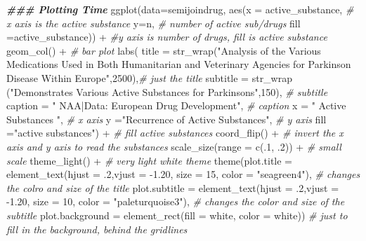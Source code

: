 \documentclass[
]{article}
\newenvironment{Shaded}{\begin{snugshade}}{\end{snugshade}}
\newcommand{\AttributeTok}[1]{\textcolor[rgb]{0.77,0.63,0.00}{#1}}
\newcommand{\CommentTok}[1]{\textcolor[rgb]{0.56,0.35,0.01}{\textit{#1}}}
\newcommand{\DecValTok}[1]{\textcolor[rgb]{0.00,0.00,0.81}{#1}}
\newcommand{\DocumentationTok}[1]{\textcolor[rgb]{0.56,0.35,0.01}{\textbf{\textit{#1}}}}
\newcommand{\FloatTok}[1]{\textcolor[rgb]{0.00,0.00,0.81}{#1}}
\newcommand{\FunctionTok}[1]{\textcolor[rgb]{0.00,0.00,0.00}{#1}}
\newcommand{\NormalTok}[1]{#1}
\newcommand{\SpecialCharTok}[1]{\textcolor[rgb]{0.00,0.00,0.00}{#1}}
\newcommand{\StringTok}[1]{\textcolor[rgb]{0.31,0.60,0.02}{#1}}
\begin{document}
\begin{Shaded}
\begin{Highlighting}[]
\DocumentationTok{\#\#\# Plotting Time}
  \FunctionTok{ggplot}\NormalTok{(}\AttributeTok{data=}\NormalTok{semijoindrug,}
    \FunctionTok{aes}\NormalTok{(}\AttributeTok{x =}\NormalTok{ active\_substance,     }\CommentTok{\# x axis is the active substance}
        \AttributeTok{y=}\NormalTok{n,  }\CommentTok{\# number of active sub/drugs}
        \AttributeTok{fill =}\NormalTok{active\_substance)) }\SpecialCharTok{+}  \CommentTok{\#y axis is number of drugs, fill is active substance}
  \FunctionTok{geom\_col}\NormalTok{() }\SpecialCharTok{+}  \CommentTok{\# bar plot}
  \FunctionTok{labs}\NormalTok{(}
    \AttributeTok{title =} \FunctionTok{str\_wrap}\NormalTok{(}\StringTok{"Analysis of the Various Medications Used in Both Humanitarian and Veterinary Agencies for Parkinson Disease Within Europe"}\NormalTok{,}\DecValTok{2500}\NormalTok{),}\CommentTok{\# just the title}
    \AttributeTok{subtitle =} \FunctionTok{str\_wrap}\NormalTok{ (}\StringTok{"Demonstrates Various Active Substances for Parkinsons"}\NormalTok{,}\DecValTok{150}\NormalTok{),   }\CommentTok{\# subtitle}
    \AttributeTok{caption =} \StringTok{" NAA|Data: European Drug Development"}\NormalTok{, }\CommentTok{\# caption}
    \AttributeTok{x =} \StringTok{" Active Substances "}\NormalTok{, }\CommentTok{\# x axis}
    \AttributeTok{y =}\StringTok{"Recurrence of Active Substances"}\NormalTok{, }\CommentTok{\# y axis}
    \AttributeTok{fill =}\StringTok{"active substances"}\NormalTok{) }\SpecialCharTok{+} \CommentTok{\# fill active substances}
  \FunctionTok{coord\_flip}\NormalTok{() }\SpecialCharTok{+} \CommentTok{\# invert the x axis and y axis to read the substances}
  \FunctionTok{scale\_size}\NormalTok{(}\AttributeTok{range =} \FunctionTok{c}\NormalTok{(.}\DecValTok{1}\NormalTok{, .}\DecValTok{2}\NormalTok{)) }\SpecialCharTok{+} \CommentTok{\# small scale}
  \FunctionTok{theme\_light}\NormalTok{() }\SpecialCharTok{+} \CommentTok{\# very light white theme}
  \FunctionTok{theme}\NormalTok{(}\AttributeTok{plot.title =} \FunctionTok{element\_text}\NormalTok{(}\AttributeTok{hjust =}\NormalTok{ .}\DecValTok{2}\NormalTok{,}\AttributeTok{vjust =} \SpecialCharTok{{-}}\FloatTok{1.20}\NormalTok{, }\AttributeTok{size =} \DecValTok{15}\NormalTok{, }\AttributeTok{color =} \StringTok{"seagreen4"}\NormalTok{), }\CommentTok{\# changes the colro and size of the title}
        \AttributeTok{plot.subtitle =} \FunctionTok{element\_text}\NormalTok{(}\AttributeTok{hjust =}\NormalTok{ .}\DecValTok{2}\NormalTok{,}\AttributeTok{vjust =} \SpecialCharTok{{-}}\FloatTok{1.20}\NormalTok{, }\AttributeTok{size =} \DecValTok{10}\NormalTok{, }\AttributeTok{color =} \StringTok{"paleturquoise3"}\NormalTok{), }\CommentTok{\# changes the color and size of the subtitle}
        \AttributeTok{plot.background =} \FunctionTok{element\_rect}\NormalTok{(}\AttributeTok{fill =} \StringTok{\textquotesingle{}white\textquotesingle{}}\NormalTok{, }\AttributeTok{color =} \StringTok{\textquotesingle{}white\textquotesingle{}}\NormalTok{)) }\CommentTok{\# just to fill in the background, behind the gridlines}
\end{Highlighting}
\end{Shaded}
\end{document}
